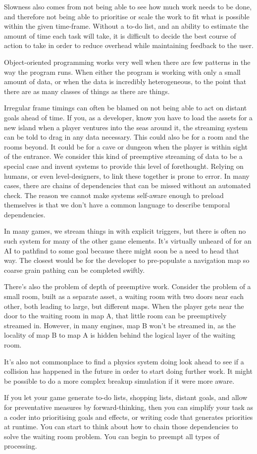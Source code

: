 \documentclass[a4paper,12pt]{book}
\begin{document}
Slowness also comes from not being able to see how much work needs to be done, and therefore not being able to prioritise or scale the work to fit what is possible within the given time-frame. Without a to-do list, and an ability to estimate the amount of time each task will take, it is difficult to decide the best course of action to take in order to reduce overhead while maintaining feedback to the user.

Object-oriented programming works very well when there are few patterns in the way the program runs. When either the program is working with only a small amount of data, or when the data is incredibly heterogeneous, to the point that there are as many classes of things as there are things.

Irregular frame timings can often be blamed on not being able to act on distant goals ahead of time. If you, as a developer, know you have to load the assets for a new island when a player ventures into the seas around it, the streaming system can be told to drag in any data necessary. This could also be for a room and the rooms beyond. It could be for a cave or dungeon when the player is within sight of the entrance. We consider this kind of preemptive streaming of data to be a special case and invent systems to provide this level of forethought. Relying on humans, or even level-designers, to link these together is prone to error. In many cases, there are chains of dependencies that can be missed without an automated check. The reason we cannot make systems self-aware enough to preload themselves is that we don't have a common language to describe temporal dependencies.

In many games, we stream things in with explicit triggers, but there is often no such system for many of the other game elements. It's virtually unheard of for an AI to pathfind to some goal because there might soon be a need to head that way. The closest would be for the developer to pre-populate a navigation map so coarse grain pathing can be completed swiftly.

There's also the problem of depth of preemptive work. Consider the problem of a small room, built as a separate asset, a waiting room with two doors near each other, both leading to large, but different maps. When the player gets near the door to the waiting room in map A, that little room can be preemptively streamed in. However, in many engines, map B won't be streamed in, as the locality of map B to map A is hidden behind the logical layer of the waiting room.

It's also not commonplace to find a physics system doing look ahead to see if a collision has happened in the future in order to start doing further work. It might be possible to do a more complex breakup simulation if it were more aware.

If you let your game generate to-do lists, shopping lists, distant goals, and allow for preventative measures by forward-thinking, then you can simplify your task as a coder into prioritising goals and effects, or writing code that generates priorities at runtime. You can start to think about how to chain those dependencies to solve the waiting room problem. You can begin to preempt all types of processing.
\end{document}
